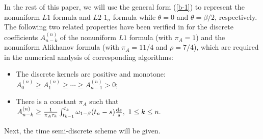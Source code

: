 \documentclass[11pt]{article}
\numberwithin{equation}{section}
\begin{document}
  In the rest of this paper, we will use the general form (\ref{b-1}) to represent the nonuniform $L1$ formula and $L2$-$1_\sigma$ formula while \( \theta = 0 \) and \( \theta = \beta/2 \), respectively. The following two related properties have been verified in \cite{LiaoH2018L1,LiaoH2021L2_1} for the discrete coefficients  \( A^{(n)}_{n-k} \)  of the nonuniform $L1$ formula (with $\pi_A = 1$) and the nonuniform Alikhanov formula
(with $\pi_A=11/4$ and $\rho=7/4$), which are required in the numerical analysis of corresponding algorithms:
\begin{itemize}
    \item[\textbf{A1.}] The discrete kernels are positive and monotone: $A_0^{(n)}\geq A_1^{(n)}\geq\cdots\geq A_{n-1}^{(n)}> 0;$
    \item[\textbf{A2.}]There is a constant $\pi_A$ such that $A_{n-k}^{(n)}
\geq\frac{1}{\pi_A\tau_k}\int_{t_{k-1}}^{t_k}\omega_{1-\beta}(t_n-s)\frac{{\rm d}s}{s},~1\leq k\leq n.$
\end{itemize}

Next, the time semi-discrete scheme will be given.
\end{document}
